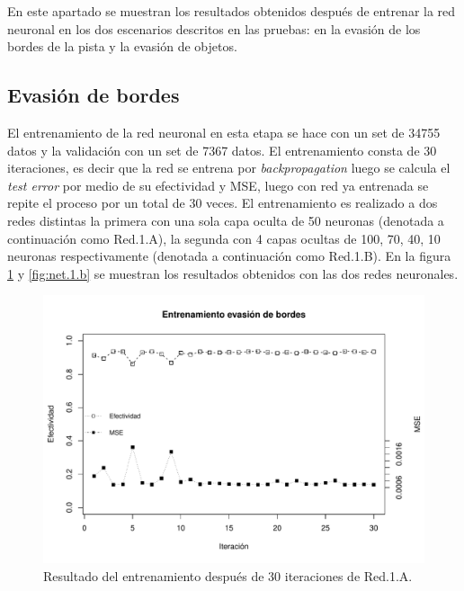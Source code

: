 \documentclass{iccmemoria}
\begin{document}
En este apartado se muestran los resultados obtenidos después de entrenar la red neuronal en los dos escenarios descritos en las pruebas: en la evasión de los bordes de la pista y la evasión de objetos.\\

\subsection{Evasión de bordes}

El entrenamiento de la red neuronal en esta etapa se hace con un set de 34755 datos y la validación con un set de 7367 datos. El entrenamiento consta de 30 iteraciones, es decir que la red se entrena por \emph{backpropagation} luego se calcula el \emph{test error} por medio de su efectividad y MSE, luego con red ya entrenada se repite el proceso por un total de 30 veces. El entrenamiento es realizado a dos redes distintas la primera con una sola capa oculta de 50 neuronas (denotada a continuación como Red.1.A), la segunda con 4 capas ocultas de 100, 70, 40, 10 neuronas respectivamente (denotada a continuación como Red.1.B). En la figura \ref{fig:net.1.a} y \ref{fig:net.1.b} se muestran los resultados obtenidos con las dos redes neuronales.\\


\begin{figure}
  \centering
  \includegraphics[width = 450pt]{images/plot_net_1_a.pdf}
  \caption[Entrenamiento primera etapa Red.1.A.]{Resultado del entrenamiento después de 30 iteraciones de Red.1.A.}
  \label{fig:net.1.a}
\end{figure}
\end{document}
